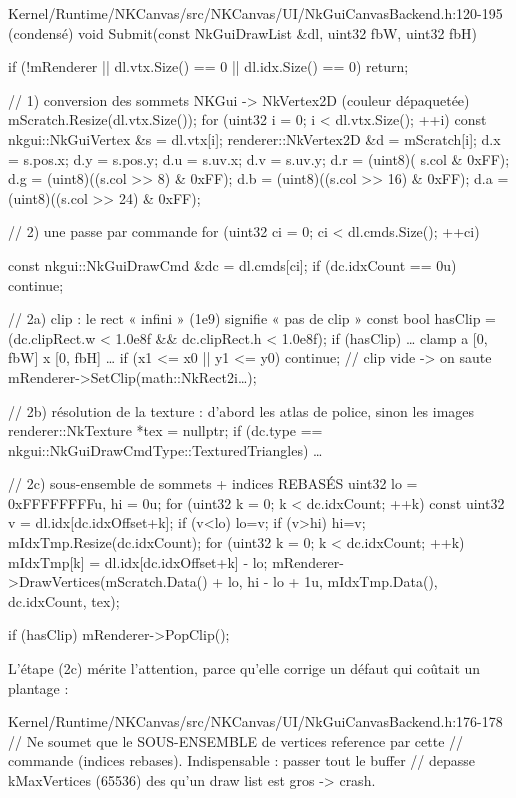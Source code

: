 \begin{nkcode}{Kernel/Runtime/NKCanvas/src/NKCanvas/UI/NkGuiCanvasBackend.h:120-195 (condensé)}
void Submit(const NkGuiDrawList &dl, uint32 fbW, uint32 fbH) {
    if (!mRenderer || dl.vtx.Size() == 0 || dl.idx.Size() == 0) return;

    // 1) conversion des sommets NKGui -> NkVertex2D (couleur dépaquetée)
    mScratch.Resize(dl.vtx.Size());
    for (uint32 i = 0; i < dl.vtx.Size(); ++i) {
        const nkgui::NkGuiVertex &s = dl.vtx[i];
        renderer::NkVertex2D &d = mScratch[i];
        d.x = s.pos.x; d.y = s.pos.y; d.u = s.uv.x; d.v = s.uv.y;
        d.r = (uint8)( s.col        & 0xFF);
        d.g = (uint8)((s.col >>  8) & 0xFF);
        d.b = (uint8)((s.col >> 16) & 0xFF);
        d.a = (uint8)((s.col >> 24) & 0xFF);
    }

    // 2) une passe par commande
    for (uint32 ci = 0; ci < dl.cmds.Size(); ++ci) {
        const nkgui::NkGuiDrawCmd &dc = dl.cmds[ci];
        if (dc.idxCount == 0u) continue;

        // 2a) clip : le rect « infini » (1e9) signifie « pas de clip »
        const bool hasClip = (dc.clipRect.w < 1.0e8f && dc.clipRect.h < 1.0e8f);
        if (hasClip) {
            … clamp a [0, fbW] x [0, fbH] …
            if (x1 <= x0 || y1 <= y0) continue;          // clip vide -> on saute
            mRenderer->SetClip(math::NkRect2i{…});
        }

        // 2b) résolution de la texture : d'abord les atlas de police, sinon les images
        renderer::NkTexture *tex = nullptr;
        if (dc.type == nkgui::NkGuiDrawCmdType::TexturedTriangles) { … }

        // 2c) sous-ensemble de sommets + indices REBASÉS
        uint32 lo = 0xFFFFFFFFu, hi = 0u;
        for (uint32 k = 0; k < dc.idxCount; ++k) { const uint32 v = dl.idx[dc.idxOffset+k];
                                                   if (v<lo) lo=v; if (v>hi) hi=v; }
        mIdxTmp.Resize(dc.idxCount);
        for (uint32 k = 0; k < dc.idxCount; ++k) mIdxTmp[k] = dl.idx[dc.idxOffset+k] - lo;
        mRenderer->DrawVertices(mScratch.Data() + lo, hi - lo + 1u, mIdxTmp.Data(), dc.idxCount, tex);

        if (hasClip) mRenderer->PopClip();
    }
}
\end{nkcode}

L'étape (2c) mérite l'attention, parce qu'elle corrige un défaut qui coûtait un
plantage :

\begin{nkcode}{Kernel/Runtime/NKCanvas/src/NKCanvas/UI/NkGuiCanvasBackend.h:176-178}
// Ne soumet que le SOUS-ENSEMBLE de vertices reference par cette
// commande (indices rebases). Indispensable : passer tout le buffer
// depasse kMaxVertices (65536) des qu'un draw list est gros -> crash.
\end{nkcode}


